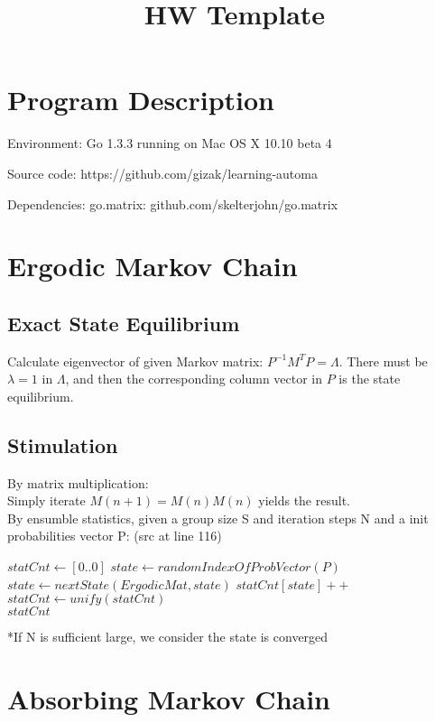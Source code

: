 \documentclass[11pt,letterpaper]{article}
\title{HW Template}
\begin{document}
\section{Program Description}
	\begin{compactitem}
	\item Environment: Go 1.3.3 running on Mac OS X 10.10 beta 4\\
	\item	Source code: https://github.com/gizak/learning-automa\\
	\item	Dependencies: go.matrix: github.com/skelterjohn/go.matrix
	\end{compactitem}
\section{Ergodic Markov Chain}
\subsection{Exact State Equilibrium}
Calculate eigenvector of given Markov matrix:
$P^{-1}M^{T}P=\Lambda$. There must be $\lambda=1$ in $\Lambda$, and then the corresponding column vector in $P$ is the state equilibrium. 
\subsection{Stimulation}
By matrix  multiplication:\\
Simply iterate $M(n+1)=M(n)M(n)$ yields the result.\\

By ensumble statistics, given a group size S and iteration steps N and a init probabilities vector P: (src at line 116)\\ 
\begin{algorithmic}
\State $statCnt \gets [0..0]$
	\State $state \gets randomIndexOfProbVector(P)$
	\State $state \gets nextState(ErgodicMat,state)$
	\EndFor
	\State $statCnt[state]++$
\EndFor
\State $statCnt \gets unify(statCnt)$\\
\Return $statCnt$
\EndFunction
\end{algorithmic}

*If N is sufficient large, we consider the state is converged

\section{Absorbing Markov Chain}
\end{document}
